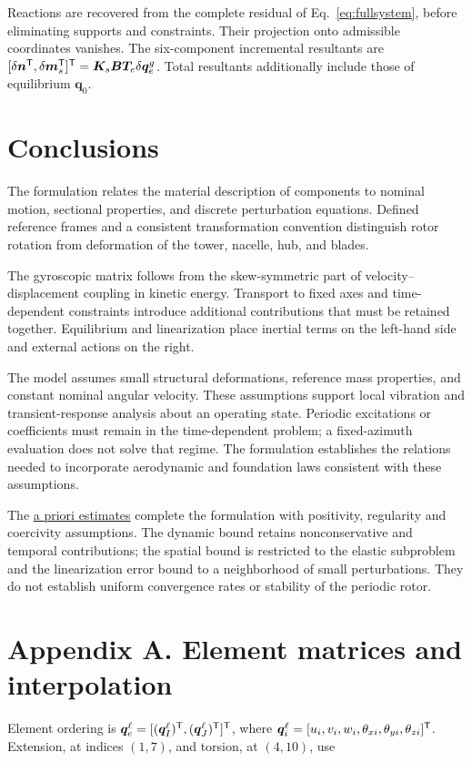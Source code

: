 Reactions are recovered from the complete residual of Eq.~\eqref{eq:fullsystem}, before eliminating supports and constraints. Their projection onto admissible coordinates vanishes. The six-component incremental resultants are $[\delta\bm n^\mathsf T,\delta\bm m_s^\mathsf T]^\mathsf T=\bm K_s\bm B\bm T_e\delta\bm q_e^g$. Total resultants additionally include those of equilibrium $\bm q_0$.

\section{Conclusions}
The formulation relates the material description of components to nominal motion, sectional properties, and discrete perturbation equations. Defined reference frames and a consistent transformation convention distinguish rotor rotation from deformation of the tower, nacelle, hub, and blades.

The gyroscopic matrix follows from the skew-symmetric part of velocity--displacement coupling in kinetic energy. Transport to fixed axes and time-dependent constraints introduce additional contributions that must be retained together. Equilibrium and linearization place inertial terms on the left-hand side and external actions on the right.

The model assumes small structural deformations, reference mass properties, and constant nominal angular velocity. These assumptions support local vibration and transient-response analysis about an operating state. Periodic excitations or coefficients must remain in the time-dependent problem; a fixed-azimuth evaluation does not solve that regime. The formulation establishes the relations needed to incorporate aerodynamic and foundation laws consistent with these assumptions.

The \hyperref[sec:apriori]{a priori estimates} complete the formulation with positivity, regularity and coercivity assumptions. The dynamic bound retains nonconservative and temporal contributions; the spatial bound is restricted to the elastic subproblem and the linearization error bound to a neighborhood of small perturbations. They do not establish uniform convergence rates or stability of the periodic rotor.

\section{Appendix A. Element matrices and interpolation}
Element ordering is $\bm q_e^\ell=[(\bm q_I^\ell)^\mathsf T,(\bm q_J^\ell)^\mathsf T]^\mathsf T$, where $\bm q_i^\ell=[u_i,v_i,w_i,\theta_{xi},\theta_{yi},\theta_{zi}]^\mathsf T$. Extension, at indices $(1,7)$, and torsion, at $(4,10)$, use

